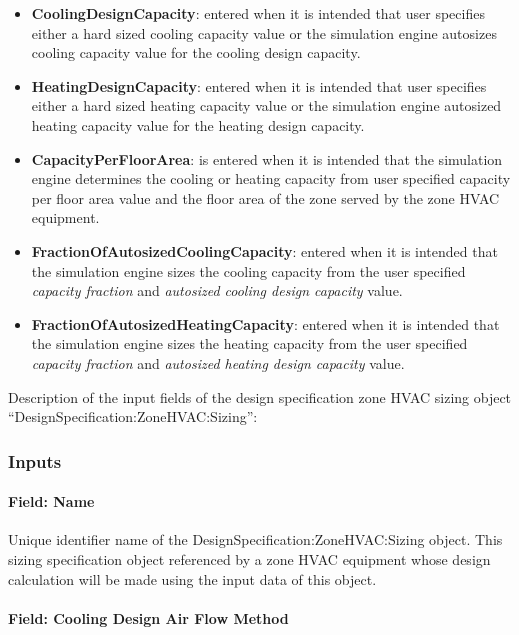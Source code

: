 \begin{itemize}
\item
  \textbf{CoolingDesignCapacity}: entered when it is intended that user specifies either a hard sized cooling capacity value or the simulation engine autosizes cooling capacity value for the cooling design capacity.
\item
  \textbf{HeatingDesignCapacity}: entered when it is intended that user specifies either a hard sized heating capacity value or the simulation engine autosized heating capacity value for the heating design capacity.
\item
  \textbf{CapacityPerFloorArea}: is entered when it is intended that the simulation engine determines the cooling or heating capacity from user specified capacity per floor area value and the floor area of the zone served by the zone HVAC equipment.
\item
  \textbf{FractionOfAutosizedCoolingCapacity}: entered when it is intended that the simulation engine sizes the cooling capacity from the user specified \emph{capacity fraction} and \emph{autosized cooling design capacity} value.
\item
  \textbf{FractionOfAutosizedHeatingCapacity}: entered when it is intended that the simulation engine sizes the heating capacity from the user specified \emph{capacity fraction} and \emph{autosized heating design capacity} value.
\end{itemize}

Description of the input fields of the design specification zone HVAC sizing object ``DesignSpecification:ZoneHVAC:Sizing'':

\subsubsection{Inputs}\label{inputs-5-007}

\paragraph{Field: Name}\label{field-name-2-009}

Unique identifier name of the DesignSpecification:ZoneHVAC:Sizing object. This sizing specification object referenced by a zone HVAC equipment whose design calculation will be made using the input data of this object.

\paragraph{Field: Cooling Design Air Flow Method}\label{field-cooling-design-air-flow-method-1}

